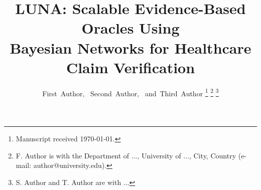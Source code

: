 \documentclass[journal]{IEEEtran}
\begin{document}
\title{LUNA: Scalable Evidence-Based Oracles Using\\
       Bayesian Networks for Healthcare Claim Verification}

\author{First~Author,~
        Second~Author,~
        and~Third~Author%
\thanks{Manuscript received \today.}%
\thanks{F. Author is with the Department of ...,
        University of ..., City, Country
        (e-mail: author@university.edu).}%
\thanks{S. Author and T. Author are with ...}}

\maketitle
\end{document}
